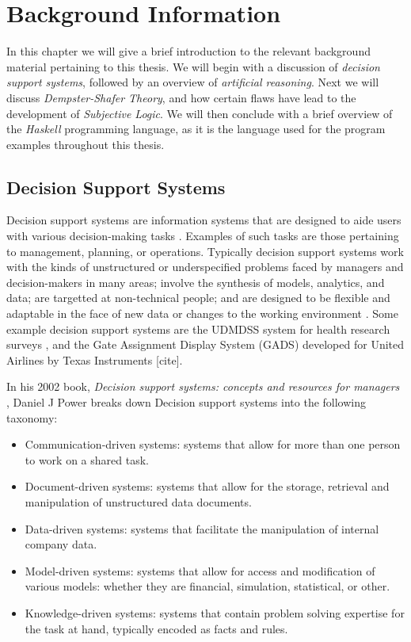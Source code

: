 \documentclass[thesis.tex]{subfiles}
\begin{document}
\chapter{Background Information}
\label{chap:background-information}

In this chapter we will give a brief introduction to the relevant background material pertaining
to this thesis. We will begin with a discussion of \emph{decision support systems}, followed by
an overview of \emph{artificial reasoning}. Next we will discuss \emph{Dempster-Shafer Theory}, and
how certain flaws have lead to the development of \emph{Subjective Logic}. We will then conclude with
a brief overview of the \emph{Haskell} programming language, as it is the language used for the program
examples throughout this thesis.





\section{Decision Support Systems}

Decision support systems are information systems that are designed to aide users with various
decision-making tasks \cite{sprague1980framework}. Examples of such tasks are those pertaining to management,
planning, or operations. Typically decision support systems work with the kinds of unstructured
or underspecified problems faced by managers and decision-makers in many areas; involve the
synthesis of models, analytics, and data; are targetted at non-technical people; and are designed
to be flexible and adaptable in the face of new data or changes to the working environment
\cite{sprague1980framework}. Some example decision support systems are the UDMDSS system
for health research surveys \cite{kent2010application},
and the Gate Assignment Display System (GADS) developed for United Airlines
by Texas Instruments [cite].

In his 2002 book, \emph{Decision support systems: concepts and resources for managers}
\cite{power2002decision}, Daniel J Power breaks down Decision support systems into the following
taxonomy:

\begin{itemize}
  \item Communication-driven systems: systems that allow for more than one person to work on a shared task.
  \item Document-driven systems: systems that allow for the storage, retrieval and manipulation of unstructured data documents.
  \item Data-driven systems: systems that facilitate the manipulation of internal company data.
  \item Model-driven systems: systems that allow for access and modification of various models: whether they are financial, simulation, statistical, or other.
  \item Knowledge-driven systems: systems that contain problem solving expertise for the task at hand, typically encoded as facts and rules.
\end{itemize}
\end{document}
